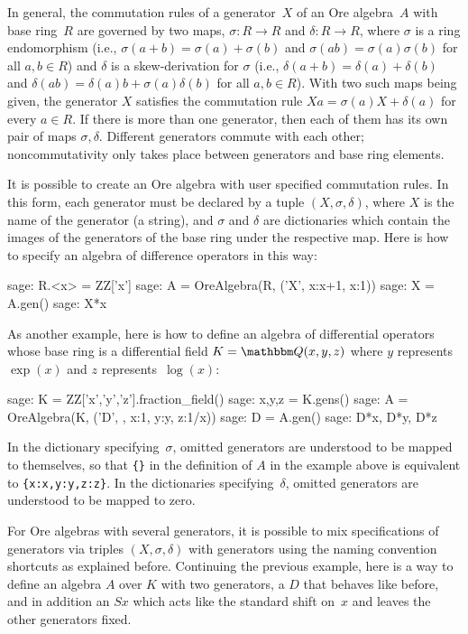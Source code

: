 \documentclass[11pt]{amsart}
\let\set\mathbbm
\begin{document}
In general, the commutation rules of a generator~$X$ of an Ore algebra~$A$ with
base ring~$R$ are governed by two maps, $\sigma\colon R\to R$ and $\delta\colon R\to R$,
where $\sigma$ is a ring endomorphism (i.e., $\sigma(a+b)=\sigma(a)+\sigma(b)$ and
$\sigma(ab)=\sigma(a)\sigma(b)$ for all $a,b\in R$) and $\delta$ is a skew-derivation
for $\sigma$ (i.e., $\delta(a+b)=\delta(a)+\delta(b)$ and $\delta(ab)=\delta(a)b
+\sigma(a)\delta(b)$ for all $a,b\in R$). With two such maps being given, the
generator $X$ satisfies the commutation rule $Xa=\sigma(a)X+\delta(a)$ for every
$a\in R$. If there is more than one generator, then each of them has its own pair
of maps $\sigma,\delta$. Different generators commute with each other; 
noncommutativity only takes place between generators and base ring elements. 

It is possible to create an Ore algebra with user specified commutation rules.
In this form, each generator must be declared by a tuple $(X,\sigma,\delta)$, 
where $X$ is the name of the generator (a string), and $\sigma$ and $\delta$
are dictionaries which contain the images of the generators of the base
ring under the respective map. Here is how to specify an algebra of difference
operators in this way:

\begin{sageexample}
  sage: R.<x> = ZZ['x']
  sage: A = OreAlgebra(R, ('X', {x:x+1}, {x:1}))
  sage: X = A.gen()
  sage: X*x
\end{sageexample}

As another example, here is how to define an algebra of differential operators 
whose base ring is a differential field $K=\set Q(x,y,z)$ where $y$ represents
$\exp(x)$ and $z$ represents~$\log(x)$:

\begin{sageexample}
  sage: K = ZZ['x','y','z'].fraction_field()
  sage: x,y,z = K.gens()
  sage: A = OreAlgebra(K, ('D', {}, {x:1, y:y, z:1/x}))
  sage: D = A.gen()
  sage: D*x, D*y, D*z
\end{sageexample}

In the dictionary specifying~$\sigma$, omitted generators are understood to be
mapped to themselves, so that \verb|{}| in the definition of $A$ in the example
above is equivalent to \verb|{x:x,y:y,z:z}|. In the dictionaries
specifying~$\delta$, omitted generators are understood to be mapped to zero.

For Ore algebras with several generators, it is possible to mix specifications
of generators via triples $(X,\sigma,\delta)$ with generators using the naming
convention shortcuts as explained before. Continuing the previous example,
here is a way to define an algebra $A$ over $K$ with two generators, a $D$ 
that behaves like before, and in addition an $Sx$ which acts like the standard
shift on~$x$ and leaves the other generators fixed.
\end{document}
